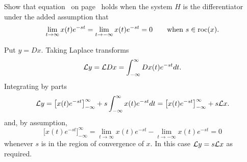 \begin{excersizelist}
\item \label{exer:laplacetransdiffproperty} Show that equation~ on page~ holds when the system $H$ is the differentiator under the added assumption that 
\[
\lim_{t\to\infty} x(t) e^{-st} = \lim_{t\to-\infty} x(t) e^{-st} = 0 \qquad \text{when $s \in \operatorname{roc}(x)$}.
\] 
\begin{solution}

Put $y = Dx$.  Taking Laplace transforms
\[
\mathcal L y = \mathcal L D x = \int_{-\infty}^{\infty} Dx(t) e^{-st} dt.
\]
Integrating by parts 
\[
\mathcal L y = \big[ x(t) e^{-st} \big]_{-\infty}^\infty + s\int_{-\infty}^{\infty} x(t) e^{-st} dt = \big[ x(t) e^{-st} \big]_{-\infty}^\infty + s\mathcal L x.
\]
and, by assumption, 
\[
\big[ x(t) e^{-st} \big]_{-\infty}^\infty = \lim_{t\to\infty} x(t) e^{-st}  - \lim_{t\to-\infty} x(t) e^{-st} = 0
\] 
whenever $s$ is in the region of convergence of $x$.  In this case $\mathcal L y = s\mathcal L x$ as required.


\end{solution}
\end{excersizelist}
